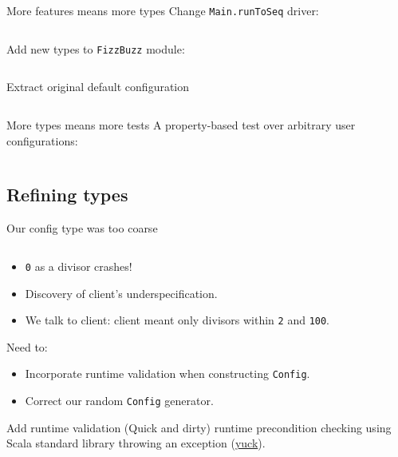 \begin{frame}[fragile]{More features means more types}
  Change \texttt{Main.runToSeq} driver:
  \inputminted[gobble=2]{scala}{Main5.scala}

  Add new types to \texttt{FizzBuzz} module:
  \inputminted[gobble=2]{scala}{FizzBuzz3.scala}
\end{frame}

\begin{frame}[fragile]{Extract original default configuration}
  \inputminted{scala}{Defaults1.scala}
\end{frame}

\begin{frame}[fragile]{More types means more tests}
  A property-based test over \alert{arbitrary} user configurations:
  \inputminted[gobble=2]{scala}{FizzBuzzSpec6.scala}
\end{frame}

\subsection{Refining types}

\begin{frame}[fragile]{Our config type was too coarse}
  \inputminted{console}{testQuick6.console}

  \begin{itemize}
  \item \texttt{0} as a divisor \alert{crashes}!
  \item Discovery of client's \alert{underspecification}.
  \item We talk to client: client meant only divisors within \texttt{2} and \texttt{100}.
  \end{itemize}

  Need to:
  \begin{itemize}
  \item Incorporate runtime \alert{validation} when constructing \texttt{Config}.
  \item Correct our random \texttt{Config} generator.
  \end{itemize}
\end{frame}

\begin{frame}[fragile]{Add runtime validation}
  (Quick and dirty) \alert{runtime} precondition checking using Scala standard library throwing an \alert{exception} (\href{http://blog.jessitron.com/2013/06/whats-dirtier-than-comments-exceptions.html}{yuck}).

  \inputminted[gobble=2]{scala}{FizzBuzz3Validate.scala}
\end{frame}

